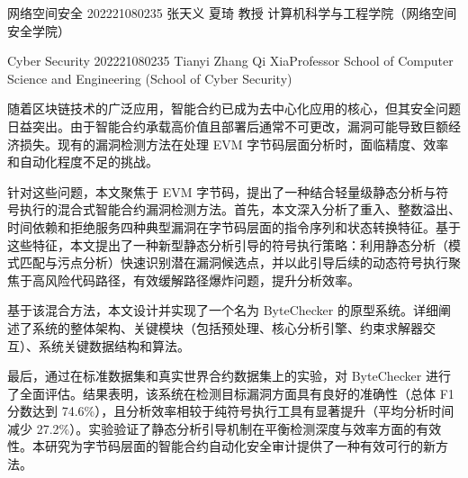 \documentclass[print, master, vlined, timesmath]{DissertUESTC}
\begin{document}
 {网络空间安全}
 {202221080235}
 {张天义}
 {夏琦}
 {教授}
 {计算机科学与工程学院（网络空间安全学院）} 

 \DegLv{}  %


 {Cyber Security}
 {202221080235}
 {Tianyi Zhang}
 {Qi Xia}{Professor}
 {School of Computer Science and Engineering (School of Cyber Security)}


\zhabstract
随着区块链技术的广泛应用，智能合约已成为去中心化应用的核心，但其安全问题日益突出。由于智能合约承载高价值且部署后通常不可更改，漏洞可能导致巨额经济损失。现有的漏洞检测方法在处理 EVM 字节码层面分析时，面临精度、效率和自动化程度不足的挑战。

针对这些问题，本文聚焦于 EVM 字节码，提出了一种结合轻量级静态分析与符号执行的混合式智能合约漏洞检测方法。首先，本文深入分析了重入、整数溢出、时间依赖和拒绝服务四种典型漏洞在字节码层面的指令序列和状态转换特征。基于这些特征，本文提出了一种新型静态分析引导的符号执行策略：利用静态分析（模式匹配与污点分析）快速识别潜在漏洞候选点，并以此引导后续的动态符号执行聚焦于高风险代码路径，有效缓解路径爆炸问题，提升分析效率。

基于该混合方法，本文设计并实现了一个名为 ByteChecker 的原型系统。详细阐述了系统的整体架构、关键模块（包括预处理、核心分析引擎、约束求解器交互）、系统关键数据结构和算法。

最后，通过在标准数据集和真实世界合约数据集上的实验，对 ByteChecker 进行了全面评估。结果表明，该系统在检测目标漏洞方面具有良好的准确性（总体 F1 分数达到 74.6\%），且分析效率相较于纯符号执行工具有显著提升（平均分析时间减少 27.2\%）。实验验证了静态分析引导机制在平衡检测深度与效率方面的有效性。本研究为字节码层面的智能合约自动化安全审计提供了一种有效可行的新方法。

\end{document}
